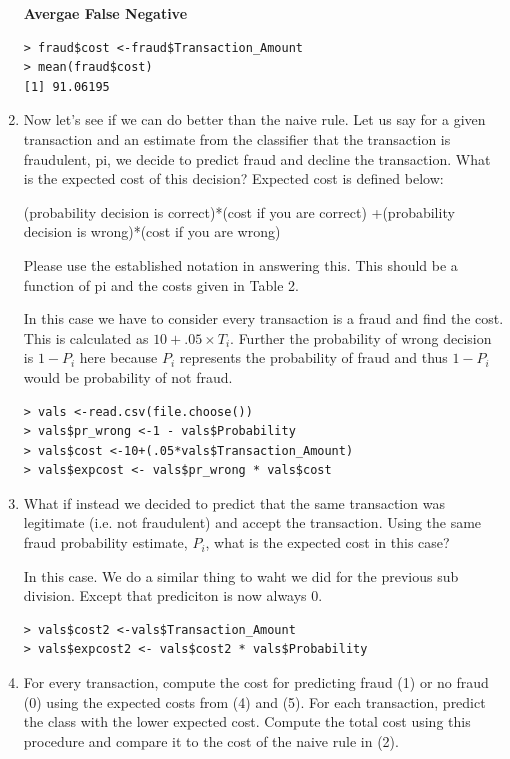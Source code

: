\documentclass[fontsize=10pt]{scrartcl}
\begin{document}
\begin{enumerate}
			\textbf{Avergae False Negative}
\begin{verbatim}
> fraud$cost <-fraud$Transaction_Amount
> mean(fraud$cost)
[1] 91.06195
\end{verbatim}

		\item
		Now let’s see if we can do better than the naive rule. Let us say for a given transaction and an estimate from the classifier that the transaction is fraudulent, pi, we decide to predict fraud and decline the transaction. What is the expected cost of this decision? Expected cost is defined below: 
		\begin{center}
			(probability decision is correct)*(cost if you are correct) +(probability decision is wrong)*(cost if you are wrong)
		\end{center}
		Please use the established notation in answering this. This should be a function of pi and the costs given in Table 2.

		In this case we have to consider every transaction is a fraud and find the cost.  This is calculated as $10 + .05 \times T_{i}$.
		Further the probability of wrong decision is $1-P_{i}$ here because $P_{i}$ represents the probability of fraud and thus $1-P_{i}$ would be probability of not fraud.

\begin{verbatim}
> vals <-read.csv(file.choose())
> vals$pr_wrong <-1 - vals$Probability
> vals$cost <-10+(.05*vals$Transaction_Amount)
> vals$expcost <- vals$pr_wrong * vals$cost
\end{verbatim}

		\item
		What if instead we decided to predict that the same transaction was legitimate (i.e. not fraudulent) and accept the transaction. Using the same fraud probability estimate, $P_{i}$, what is the expected cost in this case?

		In this case. We do a similar thing to waht we did for the previous sub division. Except that prediciton is now always 0.

\begin{verbatim}
> vals$cost2 <-vals$Transaction_Amount
> vals$expcost2 <- vals$cost2 * vals$Probability
\end{verbatim}

		\item
		For every transaction, compute the cost for predicting fraud (1) or no fraud (0) using the expected costs from (4) and (5). For each transaction, predict the class with the lower expected cost. Compute the total cost using this procedure and compare it to the cost of the naive rule in (2).


\end{enumerate}
\end{document}
